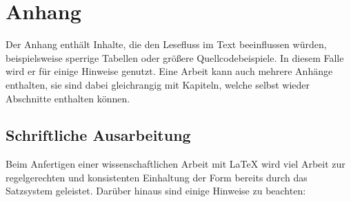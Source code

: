 \chapter{Anhang}


Der Anhang enthält Inhalte, die den Lesefluss im Text beeinflussen würden, beispielsweise sperrige Tabellen oder größere Quellcodebeispiele. In diesem Falle wird er für einige Hinweise genutzt. Eine Arbeit kann auch mehrere Anhänge enthalten, sie sind dabei gleichrangig mit Kapiteln, welche selbst wieder Abschnitte enthalten können.

\section{Schriftliche Ausarbeitung}
Beim Anfertigen einer wissenschaftlichen Arbeit mit \LaTeX{} wird viel Arbeit zur regelgerechten und konsistenten Einhaltung der Form bereits durch das Satzsystem geleistet. Darüber hinaus sind einige Hinweise zu beachten:
